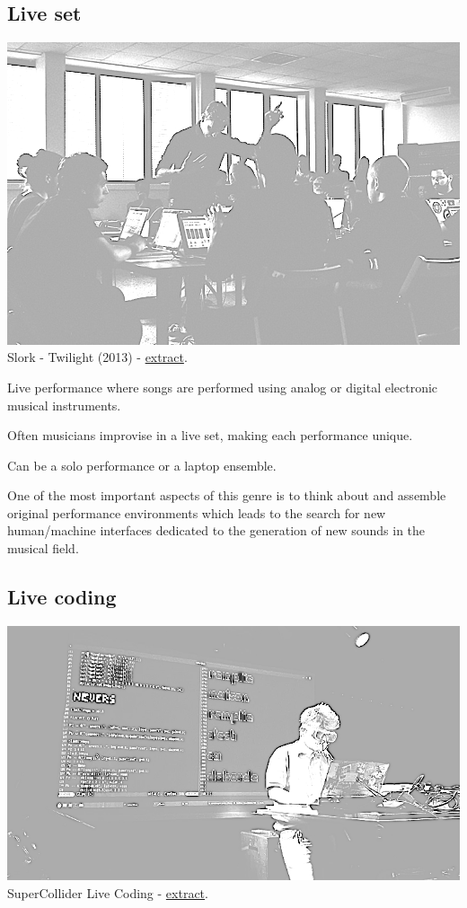 \subsection{Live set }\label{live-set}

\begin{center}
\includegraphics[scale=0.5]{../img/ensemble.png}\\
Slork - Twilight (2013) - \href{suoni/slork1.mp4}{extract}.
\end{center}

Live performance where songs are performed using analog or digital electronic musical instruments.

Often musicians improvise in a live set, making each performance unique.

Can be a solo performance or a laptop ensemble.

One of the most important aspects of this genre is to think about and assemble original performance environments which leads to the search for new human/machine interfaces dedicated to the generation of new sounds in the musical field.

\subsection{Live coding}\label{live-coding}

\begin{center}
\includegraphics[scale=0.5]{../img/livecod.png}\\
SuperCollider Live Coding - \href{suoni/livec1.mp4}{extract}.
\end{center}

